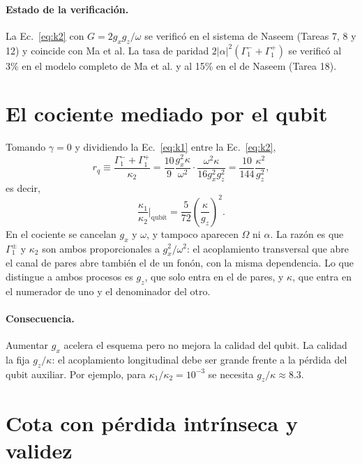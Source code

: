 \documentclass[11pt]{report}
\begin{document}
\paragraph{Estado de la verificaci\'on.} La Ec.~\eqref{eq:k2} con $G=2g_{x}g_{z}/\omega$ se verific\'o en el sistema de Naseem (Tareas 7, 8 y 12) y coincide con Ma et al. La tasa de paridad $2|\alpha|^{2}(\Gamma_{1}^{-}+\Gamma_{1}^{+})$ se verific\'o al 3\% en el modelo completo de Ma et al. y al 15\% en el de Naseem (Tarea 18).

\section{El cociente mediado por el qubit}

Tomando $\gamma=0$ y dividiendo la Ec.~\eqref{eq:k1} entre la Ec.~\eqref{eq:k2},
\begin{equation}
r_{q}\equiv\frac{\Gamma_{1}^{-}+\Gamma_{1}^{+}}{\kappa_{2}}
=\frac{10}{9}\frac{g_{x}^{2}\kappa}{\omega^{2}}\cdot\frac{\omega^{2}\kappa}{16g_{x}^{2}g_{z}^{2}}
=\frac{10}{144}\frac{\kappa^{2}}{g_{z}^{2}},
\end{equation}
es decir,
\begin{equation}
\boxed{\frac{\kappa_{1}}{\kappa_{2}}\bigg|_{\mathrm{qubit}}=\frac{5}{72}\left(\frac{\kappa}{g_{z}}\right)^{2}}.
\label{eq:rq}
\end{equation}
En el cociente se cancelan $g_{x}$ y $\omega$, y tampoco aparecen $\Omega$ ni $\alpha$. La raz\'on es que $\Gamma_{1}^{\pm}$ y $\kappa_{2}$ son ambos proporcionales a $g_{x}^{2}/\omega^{2}$: el acoplamiento transversal que abre el canal de pares abre tambi\'en el de un fon\'on, con la misma dependencia. Lo que distingue a ambos procesos es $g_{z}$, que solo entra en el de pares, y $\kappa$, que entra en el numerador de uno y el denominador del otro.

\paragraph{Consecuencia.} Aumentar $g_{x}$ acelera el esquema pero no mejora la calidad del qubit. La calidad la fija $g_{z}/\kappa$: el acoplamiento longitudinal debe ser grande frente a la p\'erdida del qubit auxiliar. Por ejemplo, para $\kappa_{1}/\kappa_{2}=10^{-3}$ se necesita $g_{z}/\kappa\approx8.3$.

\section{Cota con p\'erdida intr\'inseca y validez}
\end{document}
